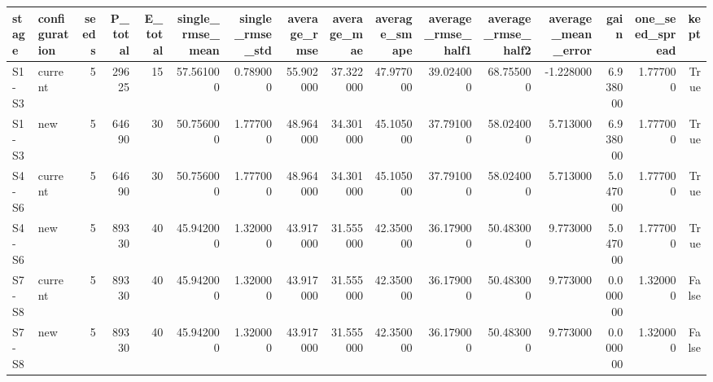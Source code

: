 \begin{tabular}{llrrrrrrrrrrrrrr}
\toprule
stage & configuration & seeds & P_total & E_total & single_rmse_mean & single_rmse_std & average_rmse & average_mae & average_smape & average_rmse_half1 & average_rmse_half2 & average_mean_error & gain & one_seed_spread & kept \\
\midrule
S1-S3 & current & 5 & 29625 & 15 & 57.561000 & 0.789000 & 55.902000 & 37.322000 & 47.977000 & 39.024000 & 68.755000 & -1.228000 & 6.938000 & 1.777000 & True \\
S1-S3 & new & 5 & 64690 & 30 & 50.756000 & 1.777000 & 48.964000 & 34.301000 & 45.105000 & 37.791000 & 58.024000 & 5.713000 & 6.938000 & 1.777000 & True \\
S4-S6 & current & 5 & 64690 & 30 & 50.756000 & 1.777000 & 48.964000 & 34.301000 & 45.105000 & 37.791000 & 58.024000 & 5.713000 & 5.047000 & 1.777000 & True \\
S4-S6 & new & 5 & 89330 & 40 & 45.942000 & 1.320000 & 43.917000 & 31.555000 & 42.350000 & 36.179000 & 50.483000 & 9.773000 & 5.047000 & 1.777000 & True \\
S7-S8 & current & 5 & 89330 & 40 & 45.942000 & 1.320000 & 43.917000 & 31.555000 & 42.350000 & 36.179000 & 50.483000 & 9.773000 & 0.000000 & 1.320000 & False \\
S7-S8 & new & 5 & 89330 & 40 & 45.942000 & 1.320000 & 43.917000 & 31.555000 & 42.350000 & 36.179000 & 50.483000 & 9.773000 & 0.000000 & 1.320000 & False \\
\bottomrule
\end{tabular}

